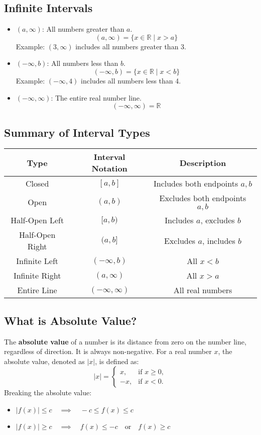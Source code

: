 \subsection{Infinite Intervals}
\begin{itemize}
    \item \((a, \infty)\): All numbers greater than \(a\).
    \[
    (a, \infty) = \{x \in \mathbb{R} \mid x > a\}
    \]
    Example: \((3, \infty)\) includes all numbers greater than 3.

    \item \((-\infty, b)\): All numbers less than \(b\).
    \[
    (-\infty, b) = \{x \in \mathbb{R} \mid x < b\}
    \]
    Example: \((-\infty, 4)\) includes all numbers less than 4.

    \item \((-\infty, \infty)\): The entire real number line.
    \[
    (-\infty, \infty) = \mathbb{R}
    \]
\end{itemize}

\subsection{Summary of Interval Types}
\begin{tabular}{|c|c|c|}
    \hline
    \textbf{Type} & \textbf{Interval Notation} & \textbf{Description} \\
    \hline
    Closed         & \([a, b]\)      & Includes both endpoints \(a, b\) \\
    Open           & \((a, b)\)      & Excludes both endpoints \(a, b\) \\
    Half-Open Left & \([a, b)\)      & Includes \(a\), excludes \(b\) \\
    Half-Open Right & \((a, b]\)     & Excludes \(a\), includes \(b\) \\
    Infinite Left  & \((-\infty, b)\)& All \(x < b\) \\
    Infinite Right & \((a, \infty)\) & All \(x > a\) \\
    Entire Line    & \((-\infty, \infty)\) & All real numbers \\
    \hline
\end{tabular}

\subsection{What is Absolute Value?}
The \textbf{absolute value} of a number is its distance from zero on the number line, regardless of direction. It is always non-negative.
For a real number \(x\), the absolute value, denoted as \(|x|\), is defined as:
\[
|x| =
\begin{cases} 
x, & \text{if } x \geq 0, \\
-x, & \text{if } x < 0.
\end{cases}
\]
Breaking the absolute value: 
\begin{itemize}
    \item \( |f(x)| \leq c \quad \implies \quad -c \leq f(x) \leq c \)
    \item \( |f(x)| \geq c \quad \implies \quad f(x) \leq -c \quad \text{or} \quad f(x) \geq c \)
\end{itemize}

